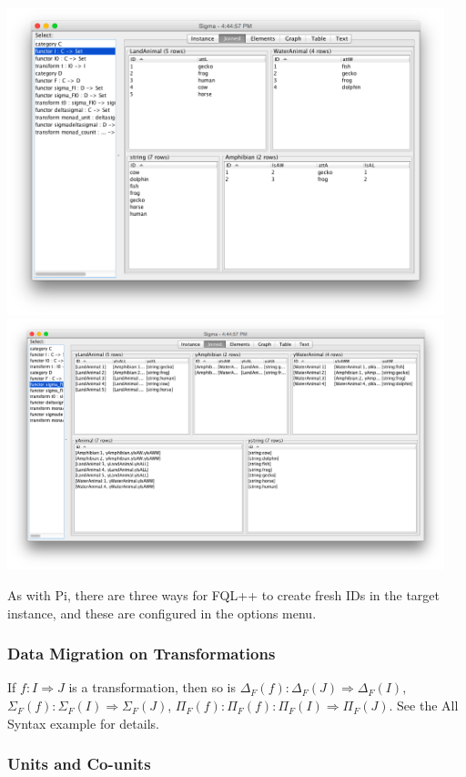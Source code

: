 \documentclass[12pt]{article}
\begin{document}
\begin{center}
\includegraphics[width=5in]{sigmaI}
\vspace{-.2in}
\includegraphics[width=5in]{sigmaJ}
\end{center}
\vspace{-.2in}
As with Pi, there are three ways for FQL++ to create fresh IDs in the target instance, and these are configured in the options menu.

\subsubsection{Data Migration on Transformations}

If $f : I \Rightarrow J$ is a transformation, then so is $\Delta_F(f) : \Delta_F(J) \Rightarrow \Delta_F(I)$, $\Sigma_F(f) : \Sigma_F(I) \Rightarrow \Sigma_F(J)$, $\Pi_F(f) : \Pi_F(f) : \Pi_F(I) \Rightarrow \Pi_F(J)$.  See the All Syntax example for details.

\subsubsection{Units and Co-units}
\end{document}
